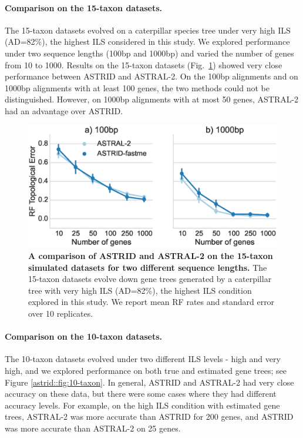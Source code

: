 \paragraph{Comparison  on the 15-taxon datasets. }
The 15-taxon datasets evolved on a caterpillar
species tree under very high ILS (AD=82\%), the highest
ILS considered in this study.
We explored performance under two sequence lengths (100bp and 1000bp)
and varied the number of genes from 10 to 1000. 
Results on the 15-taxon datasets (Fig.~\ref{astrid::fig:15taxon})
showed very close performance between ASTRID and ASTRAL-2.
On the 100bp alignments and on 1000bp alignments with
at least 100 genes, the  two methods could not be distinguished.
However, on 1000bp alignments with at most 50 genes, ASTRAL-2
had an advantage over ASTRID.
\begin{figure}
  \centering
  \includegraphics[width=12cm]{astrid-figs/15-taxon.eps}
  \caption[Comparison of ASTRID and ASTRAL-2  on the 15-taxon simulated
      datasets for two different sequence lengths]{\textbf{A comparison of ASTRID and ASTRAL-2  on the 15-taxon simulated
      datasets for two different sequence lengths.} The 15-taxon datasets
evolve down gene trees generated by a caterpillar
tree with very high ILS (AD=82\%), the highest ILS condition
explored in this study. We report mean RF 
      rates and standard error over 10 replicates. 
}  
  \label{astrid::fig:15taxon}
\end{figure}

\paragraph{Comparison on the 10-taxon datasets. }
The 10-taxon datasets evolved under two different ILS levels - high
and very high, and we explored performance  on both true and
estimated
gene trees; see Figure \ref{astrid::fig:10-taxon}.
In general, ASTRID and ASTRAL-2 had very close accuracy
on these data, but
there were some cases where they had different accuracy levels.
For example, on the high ILS condition with estimated
gene trees, ASTRAL-2 
 was more accurate 
than ASTRID for 200 genes, and ASTRID was
more accurate than ASTRAL-2 
 on 25 genes.





